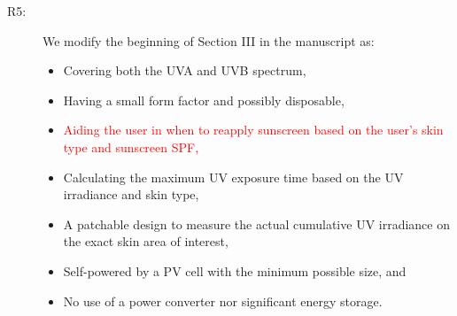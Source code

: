 \documentclass[onecolumn]{IEEEconf}
\begin{document}
\begin{description}
\item [R5: ] We modify the beginning of Section III in the manuscript as:

\begin{itemize}
\item Covering both the UVA and UVB spectrum,
\item Having a small form factor and possibly disposable,
\item \textcolor{red}{Aiding the user in when to reapply sunscreen based on the user’s skin type and sunscreen SPF,}
\item Calculating the maximum UV exposure time based on the UV irradiance and skin type,
\item A patchable design to measure the actual cumulative UV irradiance on the exact skin area of interest,
\item Self-powered by a PV cell with the minimum possible size, and
\item No use of a power converter nor significant energy storage.
\end{itemize}

\end{description}

\pagebreak
\end{document}
